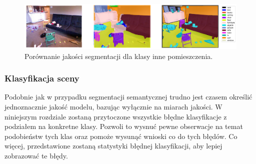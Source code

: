 \begin{figure}[ht!]
    \centering
    \includegraphics[width=\textwidth]{img/preds_analysis/gt_vs_pred/other_indoor-3.png}
    \caption{Porównanie jakości segmentacji dla klasy inne pomieszczenia.}
    \label{fig:other_indoor-pred-3}
\end{figure}

\subsubsection{Klasyfikacja sceny}
Podobnie jak w przypadku segmentacji semantycznej trudno jest czasem określić jednoznacznie jakość modelu, bazując wyłącznie na miarach jakości. W niniejszym rozdziale zostaną przytoczone wszystkie błędne klasyfikacje z podziałem na konkretne klasy. Pozwoli to wysnuć pewne obserwacje na temat podobieństw tych klas oraz pomoże wysunąć wnioski co do tych błędów. Co więcej, przedstawione zostaną statystyki błędnej klasyfikacji, aby lepiej zobrazować te błędy.

